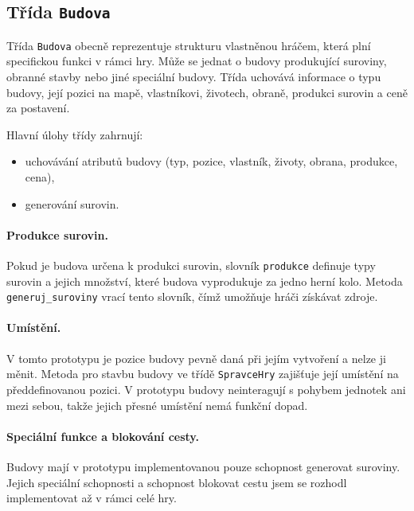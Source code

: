 \subsection{Třída \texttt{Budova}}
Třída \texttt{Budova} obecně reprezentuje strukturu vlastněnou hráčem, která plní specifickou funkci v rámci hry. Může se jednat o budovy produkující suroviny, obranné stavby nebo jiné speciální budovy. Třída uchovává informace o typu budovy, její pozici na mapě, vlastníkovi, životech, obraně, produkci surovin a ceně za postavení.

Hlavní úlohy třídy zahrnují:
\begin{itemize}
    \item uchovávání atributů budovy (typ, pozice, vlastník, životy, obrana, produkce, cena),
    \item generování surovin.
\end{itemize}

\paragraph{Produkce surovin.}
Pokud je budova určena k produkci surovin, slovník \texttt{produkce} definuje typy surovin a jejich množství, které budova vyprodukuje za jedno herní kolo. Metoda \texttt{generuj\_suroviny} vrací tento slovník, čímž umožňuje hráči získávat zdroje.

\paragraph{Umístění.}
V tomto prototypu je pozice budovy pevně daná při jejím vytvoření a nelze ji měnit. Metoda pro stavbu budovy ve třídě \texttt{SpravceHry} zajišťuje její umístění na předdefinovanou pozici. V prototypu budovy neinteragují s pohybem jednotek ani mezi sebou, takže jejich přesné umístění nemá funkční dopad. 

\paragraph{Speciální funkce a blokování cesty.} Budovy mají v prototypu implementovanou pouze schopnost generovat suroviny. Jejich speciální schopnosti a schopnost blokovat cestu jsem se rozhodl implementovat až v rámci celé hry.